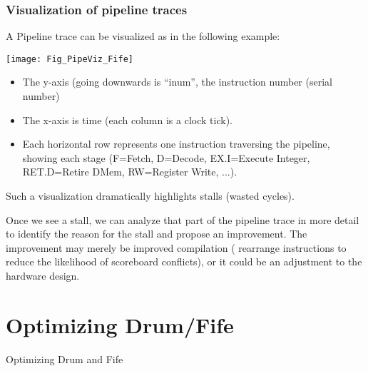 \begin{frame}[fragile]
\frametitle{Visualization of pipeline traces}

\footnotesize

A Pipeline trace can be visualized as in the following example:

\texttt{[image: Fig\_PipeViz\_Fife]}

\begin{itemize}
  \item The y-axis (going downwards is ``inum'', the instruction number (serial number)
  \item The x-axis is time (each column is a clock tick).

  \item Each horizontal row represents one instruction traversing the
        pipeline, showing each stage (F=Fetch, D=Decode, EX.I=Execute
        Integer, RET.D=Retire DMem, RW=Register Write, ...).

\end{itemize}

Such a visualization dramatically highlights stalls (wasted cycles).

Once we see a stall, we can analyze that part of the pipeline trace in
more detail to identify the reason for the stall and propose an
improvement.  The improvement may merely be improved compilation
({\eg} rearrange instructions to reduce the likelihood of scoreboard
conflicts), or it could be an adjustment to the hardware design.

\end{frame}


\section{Optimizing Drum/Fife}

\begin{frame}

\begin{center}
  {\LARGE Optimizing Drum and Fife}
\end{center}

\end{frame}


